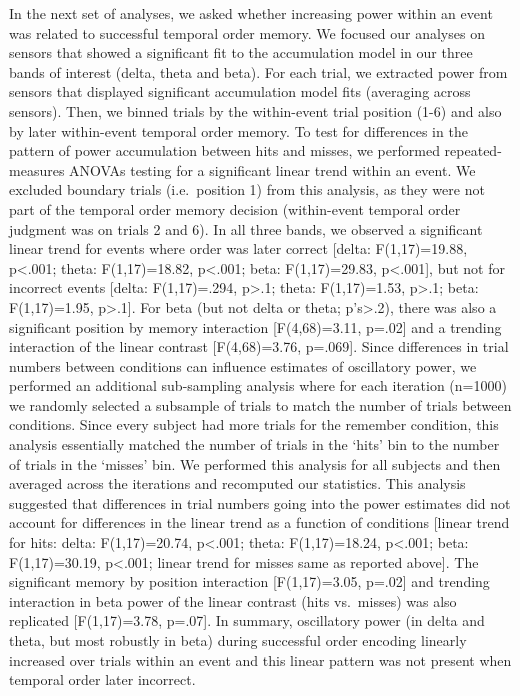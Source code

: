 In the next set of analyses, we asked whether increasing power within an
event was related to successful temporal order memory. We focused our
analyses on sensors that showed a significant fit to the accumulation
model in our three bands of interest (delta, theta and beta). For each
trial, we extracted power from sensors that displayed significant
accumulation model fits (averaging across sensors). Then, we binned
trials by the within-event trial position (1-6) and also by later
within-event temporal order memory. To test for differences in the
pattern of power accumulation between hits and misses, we performed
repeated-measures ANOVAs testing for a significant linear trend within
an event. We excluded boundary trials (i.e.~position 1) from this
analysis, as they were not part of the temporal order memory decision
(within-event temporal order judgment was on trials 2 and 6). In all
three bands, we observed a significant linear trend for events where
order was later correct {[}delta: F(1,17)=19.88, p\textless{}.001;
theta: F(1,17)=18.82, p\textless{}.001; beta: F(1,17)=29.83,
p\textless{}.001{]}, but not for incorrect events {[}delta:
F(1,17)=.294, p\textgreater{}.1; theta: F(1,17)=1.53, p\textgreater{}.1;
beta: F(1,17)=1.95, p\textgreater{}.1{]}. For beta (but not delta or
theta; p's\textgreater{}.2), there was also a significant position by
memory interaction {[}F(4,68)=3.11, p=.02{]} and a trending interaction
of the linear contrast {[}F(4,68)=3.76, p=.069{]}. Since differences in
trial numbers between conditions can influence estimates of oscillatory
power, we performed an additional sub-sampling analysis where for each
iteration (n=1000) we randomly selected a subsample of trials to match
the number of trials between conditions. Since every subject had more
trials for the remember condition, this analysis essentially matched the
number of trials in the `hits' bin to the number of trials in the
`misses' bin. We performed this analysis for all subjects and then
averaged across the iterations and recomputed our statistics. This
analysis suggested that differences in trial numbers going into the
power estimates did not account for differences in the linear trend as a
function of conditions {[}linear trend for hits: delta: F(1,17)=20.74,
p\textless{}.001; theta: F(1,17)=18.24, p\textless{}.001; beta:
F(1,17)=30.19, p\textless{}.001; linear trend for misses same as
reported above{]}. The significant memory by position interaction
{[}F(1,17)=3.05, p=.02{]} and trending interaction in beta power of the
linear contrast (hits vs.~misses) was also replicated {[}F(1,17)=3.78,
p=.07{]}. In summary, oscillatory power (in delta and theta, but most
robustly in beta) during successful order encoding linearly increased
over trials within an event and this linear pattern was not present when
temporal order later incorrect.

